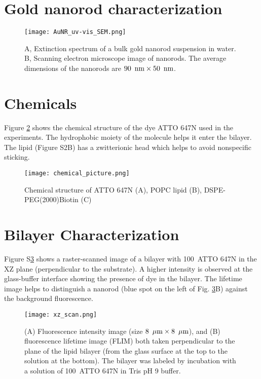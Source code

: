 \graphicspath{{chapters/c2_bilayer_efcs/si-figure/}}

\section{Gold nanorod characterization}
\begin{figure}[ht]
  \centering
  \texttt{[image: AuNR\_uv-vis\_SEM.png]}
  \makeatletter
  \renewcommand{\fnum@figure}{\figurename~S\thefigure}
  \makeatother
  \caption{A, Extinction spectrum of a bulk gold nanorod suspension in water. B, Scanning electron microscope image of nanorods. The average dimensions of the nanorods are $90~\,\textrm{nm}\times50~\,\textrm{nm}$.}
  \label{SIfig: AuNR_uv-vis}
\end{figure}

\section{Chemicals}
Figure \ref{SIfig:chemical} shows the chemical structure of the dye ATTO 647N used in the experiments. The
hydrophobic moiety of the molecule helps it enter the bilayer. The lipid (Figure S2B) has a
zwitterionic head which helps to avoid nonspecific sticking.
\begin{figure}[ht]
  \centering
  \texttt{[image: chemical\_picture.png]}
  \makeatletter
  \renewcommand{\fnum@figure}{\figurename~S\thefigure}
  \makeatother{}
  \caption{Chemical structure of ATTO 647N (A), POPC lipid (B), DSPE-PEG(2000)Biotin (C)}
  \label{SIfig:chemical}
\end{figure}
\section{Bilayer Characterization}
Figure S\ref{SIfig:xz-scan} shows a raster-scanned image of a bilayer with 100~\nM ATTO 647N in the XZ plane
(perpendicular to the substrate). A higher intensity is observed at the glass-buffer interface
showing the presence of dye in the bilayer. The lifetime image helps to distinguish a nanorod
(blue spot on the left of Fig. \ref{SIfig:xz-scan}B) against the background fluorescence.
\begin{figure}[ht]
  \centering
  \texttt{[image: xz\_scan.png]}
  \makeatletter
  \renewcommand{\fnum@figure}{\figurename~S\thefigure}
  \makeatother{}
  \caption{(A) Fluorescence intensity image (size $8~\,\mu\textrm{m}\times8~\,\mu\textrm{m}$), and (B) fluorescence lifetime image (FLIM) both taken perpendicular to the plane of the lipid bilayer (from the glass surface at the top to the solution at the bottom). The bilayer was labeled by incubation with a solution of 100~\nM ATTO 647N in Tris pH 9 buffer.}
  \label{SIfig:xz-scan}
\end{figure}

